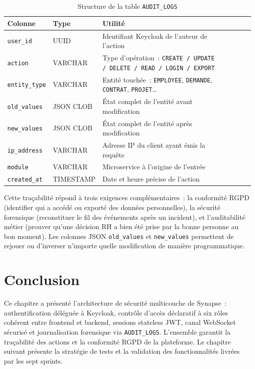 \begin{table}[H]
\centering
\caption{Structure de la table \texttt{AUDIT\_LOGS}}
\label{tab:audit_logs}
\begin{tabularx}{\textwidth}{VlVlVLV}
\hline
\textbf{Colonne} & \textbf{Type} & \textbf{Utilité} \\
\hline
\texttt{user\_id} & UUID & Identifiant Keycloak de l'auteur de l'action \\
\hline
\texttt{action} & VARCHAR & Type d'opération~: \texttt{CREATE / UPDATE / DELETE / READ / LOGIN / EXPORT} \\
\hline
\texttt{entity\_type} & VARCHAR & Entité touchée~: \texttt{EMPLOYEE}, \texttt{DEMANDE}, \texttt{CONTRAT}, \texttt{PROJET}… \\
\hline
\texttt{old\_values} & JSON CLOB & État complet de l'entité avant modification \\
\hline
\texttt{new\_values} & JSON CLOB & État complet de l'entité après modification \\
\hline
\texttt{ip\_address} & VARCHAR & Adresse IP du client ayant émis la requête \\
\hline
\texttt{module} & VARCHAR & Microservice à l'origine de l'entrée \\
\hline
\texttt{created\_at} & TIMESTAMP & Date et heure précise de l'action \\
\hline
\end{tabularx}
\end{table}

Cette traçabilité répond à trois exigences complémentaires~: la conformité RGPD
(identifier qui a accédé ou exporté des données personnelles), la sécurité
forensique (reconstituer le fil des événements après un incident), et
l'auditabilité métier (prouver qu'une décision RH a bien été prise par la
bonne personne au bon moment). Les colonnes JSON \texttt{old\_values} et
\texttt{new\_values} permettent de rejouer ou d'inverser n'importe quelle
modification de manière programmatique.

\section{Conclusion}

Ce chapitre a présenté l’architecture de sécurité multicouche de Synapse~:
authentification déléguée à Keycloak, contrôle d’accès déclaratif à six rôles
cohérent entre frontend et backend, sessions stateless JWT, canal WebSocket
sécurisé et journalisation forensique via \texttt{AUDIT\_LOGS}. L’ensemble
garantit la traçabilité des actions et la conformité RGPD de la plateforme.
Le chapitre suivant présente la stratégie de tests et la validation des
fonctionnalités livrées par les sept sprints.
